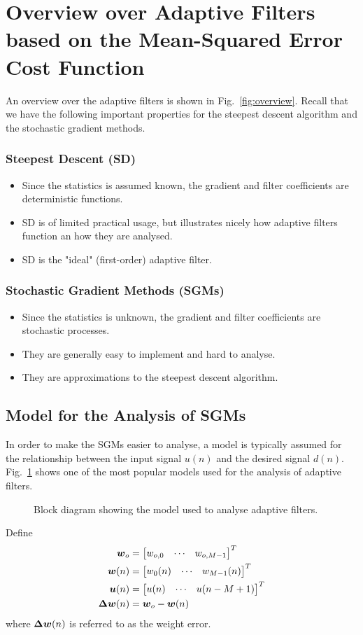 \section{Overview over Adaptive Filters based on the Mean-Squared Error Cost Function}
An overview over the adaptive filters is shown in Fig.~\ref{fig:overview}. Recall that we have the following important properties for the steepest descent algorithm and the stochastic gradient methods.
\subsubsection{Steepest Descent (SD)}
\begin{itemize}
  \item Since the statistics is assumed known, the gradient and filter coefficients are deterministic functions.
  \item SD is of limited practical usage, but illustrates nicely how adaptive filters function an how they are analysed.
  \item SD is the "ideal" (first-order) adaptive filter.
\end{itemize}
\subsubsection{Stochastic Gradient Methods (SGMs)}
\begin{itemize}
  \item Since the statistics is unknown, the gradient and filter coefficients are stochastic processes.
  \item They are generally easy to implement and hard to analyse.
  \item They are approximations to the steepest descent algorithm.
\end{itemize}

\subsection{Model for the Analysis of SGMs}
\label{ssec:analysis_model}
In order to make the SGMs easier to analyse, a model is typically assumed for the relationship between the input signal $u(n)$ and the desired signal $d(n)$. Fig.~\ref{fig:sys_id_block_diagram} shows one of the most popular models used for the analysis of adaptive filters.
\begin{figure}[htbp]
  \centering
  \caption{Block diagram showing the model used to analyse adaptive filters.}
  \label{fig:sys_id_block_diagram}
\end{figure}
Define
\begin{align}
  \boldsymbol{w}_o &= \begin{bmatrix} w_{o,0} & \cdots & w_{o,M-1} \end{bmatrix}^T\\
  \boldsymbol{w}(n) &= \begin{bmatrix} w_0(n) & \cdots & w_{M-1}(n) \end{bmatrix}^T\\
  \boldsymbol{u}(n) &= \begin{bmatrix} u(n) & \cdots & u(n-M+1) \end{bmatrix}^T\\
  \boldsymbol{\Delta}\boldsymbol{w}(n) &= \boldsymbol{w}_o-\boldsymbol{w}(n)
\end{align}
where $\boldsymbol{\Delta}\boldsymbol{w}(n)$ is referred to as the weight error.
